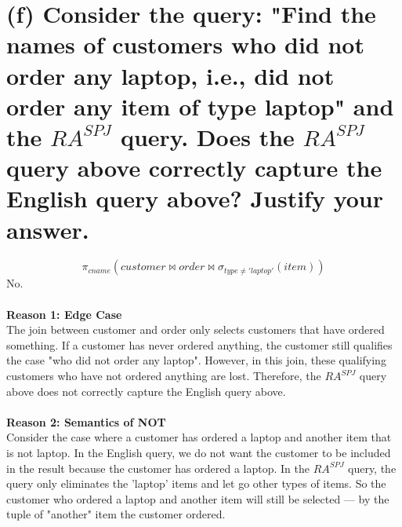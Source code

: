 \documentclass{article}
\begin{document}
\section{(f) Consider the query: "Find the names of customers who did not order any laptop, i.e., did not
order any item of type laptop" and the \(RA^{SPJ} \) query. Does the \(RA^{SPJ} \) query above correctly capture the English query above? Justify your answer.}
\[
\pi_{cname}(customer \bowtie order \bowtie \sigma_{type \neq 'laptop'}(item))
\]
No.\\
\\
\textbf{Reason 1: Edge Case}\\
The join between customer and order only selects customers that have ordered something. If a customer has never ordered anything, the customer still qualifies the case "who did not order any laptop". However, in this join, these qualifying customers who have not ordered anything are lost. Therefore, the \( RA^{SPJ} \) query above does not correctly capture the English query above.\\
\\
\textbf{Reason 2: Semantics of NOT}\\
Consider the case where a customer has ordered a laptop and another item that is not laptop. In the English query, we do not want the customer to be included in the result because the customer has ordered a laptop. In the \(RA^{SPJ}\) query, the query only eliminates the 'laptop' items and let go other types of items. So the customer who ordered a laptop and another item will still be selected --- by the tuple of "another" item the customer ordered.
\end{document}
